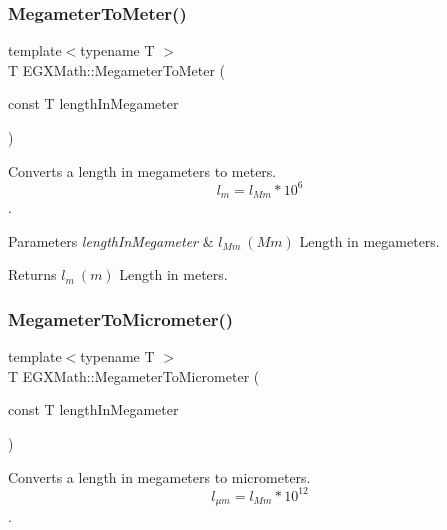 \subsubsection{\texorpdfstring{Megameter\+To\+Meter()}{MegameterToMeter()}}
{\footnotesize\ttfamily template$<$typename T $>$ \\
T E\+G\+X\+Math\+::\+Megameter\+To\+Meter (\begin{DoxyParamCaption}\item[{const T}]{length\+In\+Megameter }\end{DoxyParamCaption})}



Converts a length in megameters to meters. \[ l_{m}=l_{Mm} * 10^{6}\]. 


\begin{DoxyParams}{Parameters}
{\em length\+In\+Megameter} & $ l_{Mm}\ (Mm)$ Length in megameters. \\
\hline
\end{DoxyParams}
\begin{DoxyReturn}{Returns}
$ l_{m}\ (m)$ Length in meters. 
\end{DoxyReturn}
\mbox{\label{group___e_g_x_math-_conversions-_length_conversions-_s_i-_megameter-_s_i_ga4b0dc1e6dd503c23428038a69ff07146}} 
\subsubsection{\texorpdfstring{Megameter\+To\+Micrometer()}{MegameterToMicrometer()}}
{\footnotesize\ttfamily template$<$typename T $>$ \\
T E\+G\+X\+Math\+::\+Megameter\+To\+Micrometer (\begin{DoxyParamCaption}\item[{const T}]{length\+In\+Megameter }\end{DoxyParamCaption})}



Converts a length in megameters to micrometers. \[ l_{\mu m}=l_{Mm} * 10^{12} \]. 

